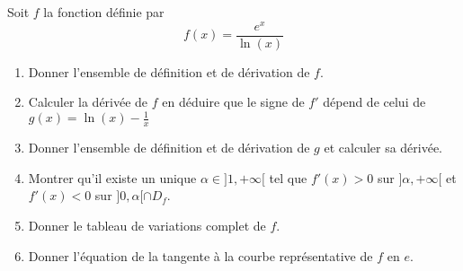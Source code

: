\documentclass[a4paper, 11pt,reqno]{article}
\begin{document}
\begin{exercice}
Soit $f$ la fonction définie par 
$$f(x)= \frac{e^{x}}{\ln(x)} $$
\begin{enumerate}
\item Donner l'ensemble de définition et de dérivation de $f$. 
\item Calculer la dérivée de $f$ en déduire que le signe de $f'$ dépend de celui de $g(x)=\ln(x) - \frac{1}{x}$
\item Donner l'ensemble de définition et de dérivation de $g$ et calculer sa dérivée. 
\item Montrer qu'il existe un unique $\alpha\in ]1,+\infty[$ tel que $f'(x)>0$ sur $]\alpha, +\infty[$ et $f'(x)<0$ sur $]0,\alpha[\cap D_f$. 
\item Donner le tableau de variations complet de $f$. 
\item Donner l'équation de la tangente à la courbe représentative de $f$ en $e$.

\end{enumerate}
\end{exercice}
\end{document}
